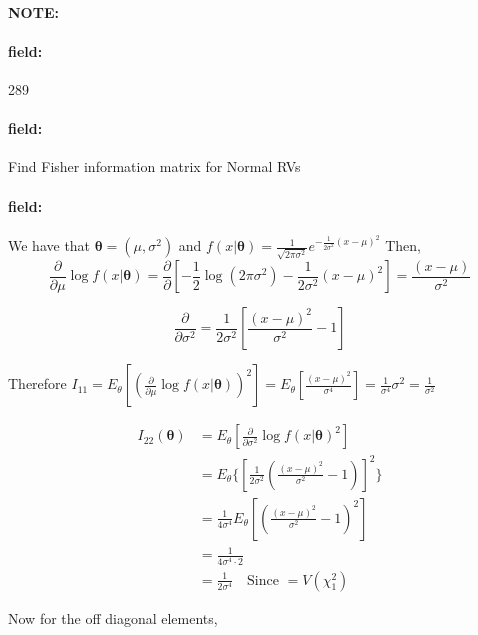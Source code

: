 \documentclass[12pt]{article}
\newenvironment{note}{\paragraph{NOTE:}}{}
\newenvironment{field}{\paragraph{field:}}{}
\begin{document}
\begin{note} \begin{field} \tiny 289 \end{field}
  \begin{field}
    Find Fisher information matrix for Normal RVs
  \end{field}
  \begin{field}
    We have that $\boldsymbol\theta = (\mu,\sigma^2)$ and $f(x|\boldsymbol\theta) = \frac{1}{\sqrt{2\pi\sigma^2}}e^{-\frac{1}{2\sigma^2}(x - \mu)^2}$
    Then,
    $$ \frac{\partial}{\partial \mu} \log f(x|\boldsymbol\theta) = \frac{\partial}{\partial}[-\frac{1}{2}\log(2\pi\sigma^2) - \frac{1}{2\sigma^2}(x - \mu)^2] = \frac{(x-\mu)}{\sigma^2}$$

    $$ \frac{\partial}{\partial\sigma^2} = \frac{1}{2\sigma^2}[ \frac{(x-\mu)^2}{\sigma^2} - 1]$$

    Therefore $I_{11} = E_\theta[(\frac{\partial}{\partial \mu}\log f(x|\boldsymbol\theta))^2] = E_\theta[\frac{(x-\mu)^2}{\sigma^4}] = \frac{1}{\sigma^4}\sigma^2 = \frac{1}{\sigma^2}$

    \begin{align*}
      I_{22}(\boldsymbol\theta) &= E_{\theta}[\frac{\partial}{\partial\sigma^2}\log f(x|\boldsymbol\theta)^2]\\
      &= E_\theta \big\{ [ \frac{1}{2\sigma^2} ( \frac{(x-\mu)^2}{\sigma^2} - 1)]^2\big\}\\
      &= \frac{1}{4\sigma^4}E_\theta[ (\frac{(x-\mu)^2}{\sigma^2} - 1)^2]\\
      &= \frac{1}{4\sigma^4 \cdot 2} \\
      &= \frac{1}{2\sigma^4} \quad \text{Since } = V(\chi^2_1)
    \end{align*}

    Now for the off diagonal elements,


\end{field}
\end{note}
\end{document}
